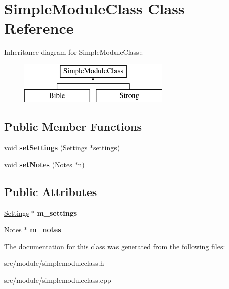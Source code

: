 \hypertarget{classSimpleModuleClass}{
\section{SimpleModuleClass Class Reference}
\label{classSimpleModuleClass}
}
Inheritance diagram for SimpleModuleClass::\begin{figure}[H]
\begin{center}
\leavevmode
\includegraphics[height=2cm]{classSimpleModuleClass}
\end{center}
\end{figure}
\subsection*{Public Member Functions}
\begin{DoxyCompactItemize}
\item 
\hypertarget{classSimpleModuleClass_a9791d744bd52f1115f2729ce51578e59}{
void {\bfseries setSettings} (\hyperlink{classSettings}{Settings} $\ast$settings)}
\label{classSimpleModuleClass_a9791d744bd52f1115f2729ce51578e59}

\item 
\hypertarget{classSimpleModuleClass_aad18677ca04f2de2fa04996174dc0c0d}{
void {\bfseries setNotes} (\hyperlink{classNotes}{Notes} $\ast$n)}
\label{classSimpleModuleClass_aad18677ca04f2de2fa04996174dc0c0d}

\end{DoxyCompactItemize}
\subsection*{Public Attributes}
\begin{DoxyCompactItemize}
\item 
\hypertarget{classSimpleModuleClass_a1b325af63815f10b4240857ed5ba4a4e}{
\hyperlink{classSettings}{Settings} $\ast$ {\bfseries m\_\-settings}}
\label{classSimpleModuleClass_a1b325af63815f10b4240857ed5ba4a4e}

\item 
\hypertarget{classSimpleModuleClass_a6884eff138f2f302c14ade7ab349037e}{
\hyperlink{classNotes}{Notes} $\ast$ {\bfseries m\_\-notes}}
\label{classSimpleModuleClass_a6884eff138f2f302c14ade7ab349037e}

\end{DoxyCompactItemize}


The documentation for this class was generated from the following files:\begin{DoxyCompactItemize}
\item 
src/module/simplemoduleclass.h\item 
src/module/simplemoduleclass.cpp\end{DoxyCompactItemize}
